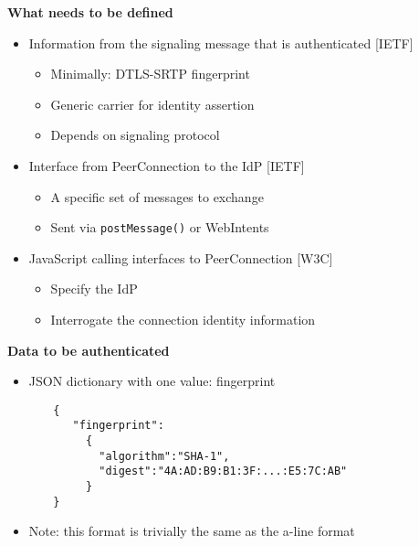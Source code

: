 \documentclass[helvetica]{seminar}
\newcommand{\heading}[1]{%
  \begin{center} 
    \large\bf 
    #1 
  \end{center} 
  \vspace{.4 in}}
\begin{document}
\begin{slide}
\heading{What needs to be defined}

\begin{itemize}
\item Information from the signaling message that is authenticated [IETF]
  \begin{itemize}
  \item Minimally: DTLS-SRTP fingerprint
  \item Generic carrier for identity assertion
  \item Depends on signaling protocol
  \end{itemize}

\item Interface from PeerConnection to the IdP [IETF]
  \begin{itemize}
  \item A specific set of messages to exchange
  \item Sent via \verb^postMessage()^ or WebIntents
  \end{itemize}

\item JavaScript calling interfaces to PeerConnection [W3C]
  \begin{itemize}
  \item Specify the IdP
  \item Interrogate the connection identity information
  \end{itemize}
\end{itemize}
\end{slide}


\begin{slide}
\heading{Data to be authenticated}

\begin{itemize}
\item JSON dictionary with one value: fingerprint
\end{itemize}

\begin{verbatim}
       {
          "fingerprint": 
            {
              "algorithm":"SHA-1",
              "digest":"4A:AD:B9:B1:3F:...:E5:7C:AB"
            }
       }
\end{verbatim}

\begin{itemize}
\item Note: this format is trivially the same as the a-line format
\end{itemize}
\end{slide}
\end{document}

